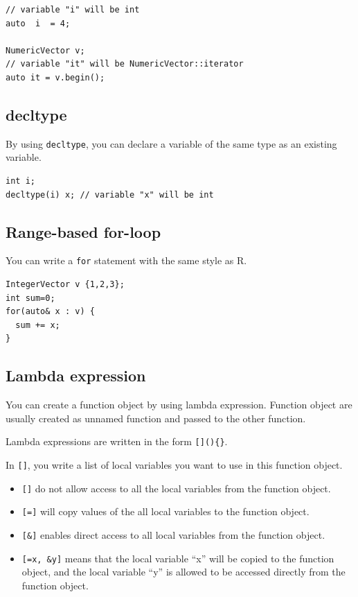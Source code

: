 \documentclass[]{book}
\providecommand{\tightlist}{%
  \setlength{\itemsep}{0pt}\setlength{\parskip}{0pt}}
\begin{document}
\begin{verbatim}
// variable "i" will be int
auto  i  = 4;

NumericVector v;
// variable "it" will be NumericVector::iterator
auto it = v.begin();
\end{verbatim}

\hypertarget{decltype}{%
\subsection{decltype}\label{decltype}}

By using \texttt{decltype}, you can declare a variable of the same type as an existing variable.

\begin{verbatim}
int i;
decltype(i) x; // variable "x" will be int
\end{verbatim}

\hypertarget{range-based-for-loop}{%
\subsection{Range-based for-loop}\label{range-based-for-loop}}

You can write a \texttt{for} statement with the same style as R.

\begin{verbatim}
IntegerVector v {1,2,3};
int sum=0;
for(auto& x : v) {
  sum += x;
}
\end{verbatim}

\hypertarget{lambda-expression}{%
\subsection{Lambda expression}\label{lambda-expression}}

You can create a function object by using lambda expression. Function object are usually created as unnamed function and passed to the other function.

Lambda expressions are written in the form \texttt{{[}{]}()\{\}}.

In \texttt{{[}{]}}, you write a list of local variables you want to use in this function object.

\begin{itemize}
\tightlist
\item
  \texttt{{[}{]}} do not allow access to all the local variables from the function object.
\item
  \texttt{{[}={]}} will copy values of the all local variables to the function object.
\item
  \texttt{{[}\&{]}} enables direct access to all local variables from the function object.
\item
  \texttt{{[}=x,\ \&y{]}} means that the local variable ``x'' will be copied to the function object, and the local variable ``y'' is allowed to be accessed directly from the function object.
\end{itemize}
\end{document}

